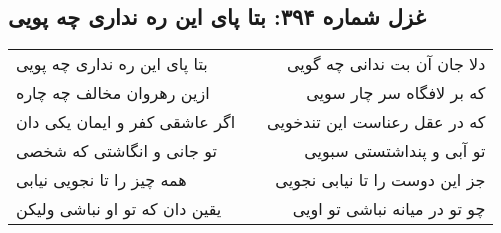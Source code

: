 \begin{center}
\section*{غزل شماره ۳۹۴: بتا پای این ره نداری چه پویی}
\label{sec:394}
\begin{longtable}{l p{0.5cm} r}
بتا پای این ره نداری چه پویی
&&
دلا جان آن بت ندانی چه گویی
\\
ازین رهروان مخالف چه چاره
&&
که بر لافگاه سر چار سویی
\\
اگر عاشقی کفر و ایمان یکی دان
&&
که در عقل رعناست این تندخویی
\\
تو جانی و انگاشتی که شخصی
&&
تو آبی و پنداشتستی سبویی
\\
همه چیز را تا نجویی نیابی
&&
جز این دوست را تا نیابی نجویی
\\
یقین دان که تو او نباشی ولیکن
&&
چو تو در میانه نباشی تو اویی
\\
\end{longtable}
\end{center}
